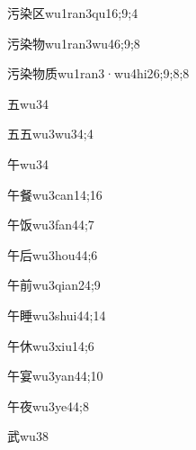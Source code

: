 \begin{verbete}{污染区}{wu1ran3qu1}{6;9;4}
\end{verbete}
\begin{verbete}{污染物}{wu1ran3wu4}{6;9;8}
\end{verbete}
\begin{verbete}{污染物质}{wu1ran3·wu4hi2}{6;9;8;8}
\end{verbete}
\begin{verbete}{五}{wu3}{4}
\end{verbete}
\begin{verbete}{五五}{wu3wu3}{4;4}
\end{verbete}
\begin{verbete}{午}{wu3}{4}
\end{verbete}
\begin{verbete}{午餐}{wu3can1}{4;16}
\end{verbete}
\begin{verbete}{午饭}{wu3fan4}{4;7}
\end{verbete}
\begin{verbete}{午后}{wu3hou4}{4;6}
\end{verbete}
\begin{verbete}{午前}{wu3qian2}{4;9}
\end{verbete}
\begin{verbete}{午睡}{wu3shui4}{4;14}
\end{verbete}
\begin{verbete}{午休}{wu3xiu1}{4;6}
\end{verbete}
\begin{verbete}{午宴}{wu3yan4}{4;10}
\end{verbete}
\begin{verbete}{午夜}{wu3ye4}{4;8}
\end{verbete}
\begin{verbete}{武}{wu3}{8}
\end{verbete}
